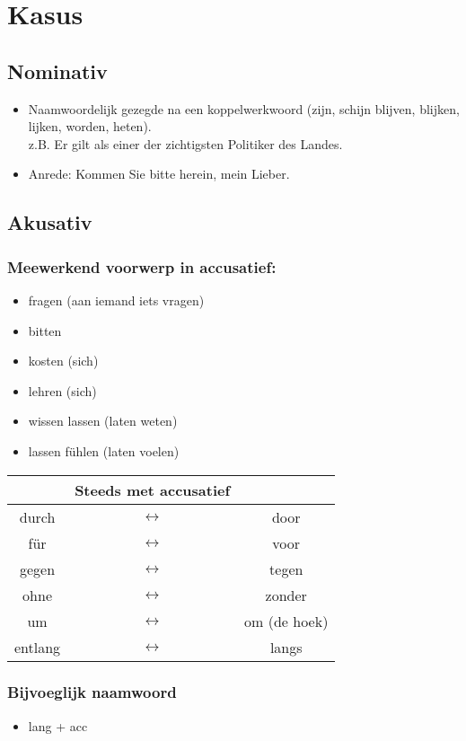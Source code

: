 \documentclass[main.tex]{subfiles}
\begin{document}
\chapter{Kasus}


\section{Nominativ}
\begin{itemize}
\item Naamwoordelijk gezegde na een koppelwerkwoord (zijn, schijn blijven, blijken, lijken, worden, heten).\\
z.B. Er gilt als einer der zichtigsten Politiker des Landes.
\item Anrede: Kommen Sie bitte herein, mein Lieber.
\end{itemize}
\section{Akusativ}
\subsection{Meewerkend voorwerp in accusatief:}
\begin{itemize}
\item fragen (aan iemand iets vragen)
\item bitten 
\item kosten (sich)
\item lehren (sich)
\item wissen lassen (laten weten)
\item lassen fühlen (laten voelen)
\end{itemize}

\begin{tabular}{ccc}
 & Steeds met accusatief &  \\ 
\hline
durch & $\leftrightarrow$ & door \\ 
für & $\leftrightarrow$ & voor \\ 
gegen & $\leftrightarrow$ & tegen \\ 
ohne & $\leftrightarrow$ & zonder \\ 
um & $\leftrightarrow$ & om (de hoek) \\ 
entlang & $\leftrightarrow$ & langs \\ 
\end{tabular} 

\subsection{Bijvoeglijk naamwoord}
\begin{itemize}
\item lang + acc
\end{itemize}
\end{document}
